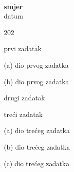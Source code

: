 \documentclass[a4paper,12pt]{article}
\begin{document}
\thispagestyle{empty}

\begin{center}
\\[2pt]
\textbf{smjer}\\[2pt]
datum
\end{center}

\vspace{10pt}

\begin{dingautolist}{202}

\item prvi zadatak
\begin{dinglist}{46}
\item (a) dio prvog zadatka
\item (b) dio prvog zadatka
\end{dinglist}

\item drugi zadatak

\item tre\'ci zadatak
\begin{dinglist}{46}
\item (a) dio tre\'ceg zadatka
\item (b) dio tre\'ceg zadatka
\item (c) dio tre\'ceg zadatka
\end{dinglist}


\end{dingautolist}
\end{document}
